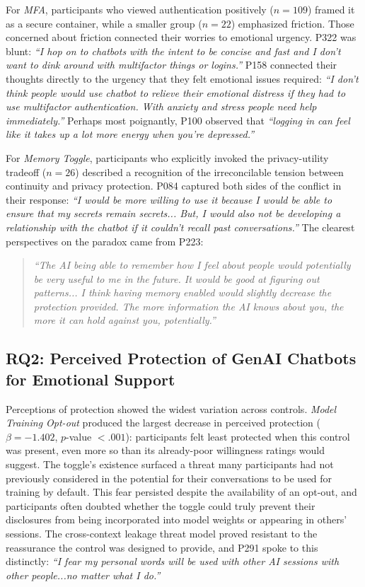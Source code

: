 \documentclass[letterpaper,twocolumn,10pt]{article}
\begin{document}
For \emph{MFA}, participants who viewed authentication positively ($n=109$) framed it as a secure container, while a smaller group ($n=22$) emphasized friction. Those concerned about friction connected their worries to emotional urgency. P322 was blunt: \textit{``I hop on to chatbots with the intent to be concise and fast and I don't want to dink around with multifactor things or logins.''} P158 connected their thoughts directly to the urgency that they felt emotional issues required: \textit{``I don't think people would use chatbot to relieve their emotional distress if they had to use multifactor authentication. With anxiety and stress people need help immediately.''} Perhaps most poignantly, P100 observed that \textit{``logging in can feel like it takes up a lot more energy when you're depressed.''}

For \emph{Memory Toggle}, participants who explicitly invoked the privacy-utility tradeoff ($n=26$) described a recognition of the irreconcilable tension between continuity and privacy protection. P084 captured both sides of the conflict in their response: \textit{``I would be more willing to use it because I would be able to ensure that my secrets remain secrets... But, I would also not be developing a relationship with the chatbot if it couldn't recall past conversations.''} The clearest perspectives on the paradox came from P223:

\begin{quote}
\textit{``The AI being able to remember how I feel about people would potentially be very useful to me in the future. It would be good at figuring out patterns... I think having memory enabled would slightly decrease the protection provided. The more information the AI knows about you, the more it can hold against you, potentially.''}
\end{quote}

\subsection{RQ2: Perceived Protection of GenAI Chatbots for Emotional Support} \label{sec:rq2-protection}

Perceptions of protection showed the widest variation across controls. \emph{Model Training Opt-out} produced the largest decrease in perceived protection ($\beta = -1.402$, $p$-value $< .001$): participants felt least protected when this control was present, even more so than its already-poor willingness ratings would suggest. The toggle's existence surfaced a threat many participants had not previously considered in the potential for their conversations to be used for training by default. This fear persisted despite the availability of an opt-out, and participants often doubted whether the toggle could truly prevent their disclosures from being incorporated into model weights or appearing in others' sessions. The cross-context leakage threat model proved resistant to the reassurance the control was designed to provide, and P291 spoke to this distinctly: \textit{``I fear my personal words will be used with other AI sessions with other people...no matter what I do.''}  
\end{document}
